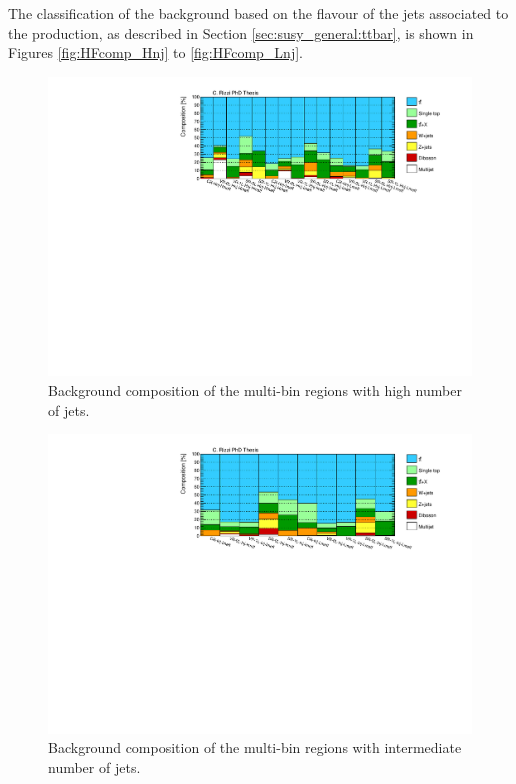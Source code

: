 The classification of the \ttbar background based on the flavour of the jets associated to the 
\ttbar production, as described in Section \ref{sec:susy_general:ttbar}, is shown in Figures 
\ref{fig:HFcomp_Hnj} to \ref{fig:HFcomp_Lnj}.

\begin{figure}[htbp]
\includegraphics[width=\textwidth]{figures/strong_prod/comp_plots/Hnj_bkg.pdf}
\caption{Background composition of the multi-bin regions with high number of jets.}
	\label{fig:bkgcomp_Hnj}
\end{figure}

\begin{figure}[htbp]
\includegraphics[width=\textwidth]{figures/strong_prod/comp_plots/Inj_bkg.pdf}
\caption{Background composition of the multi-bin regions with intermediate number of jets.}
	\label{fig:bkgcomp_Inj}
\end{figure}

